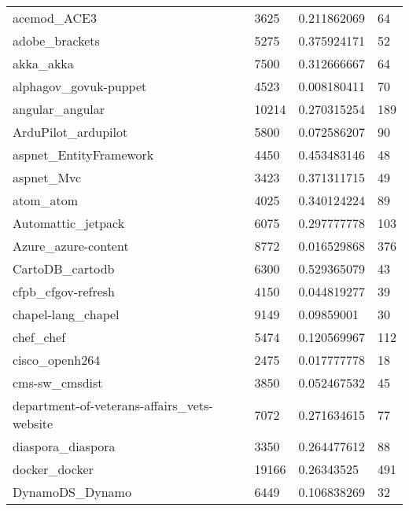 \begin{center}
\begin{longtable}{l|l|l|l}
\hline \hline
\endlastfoot

acemod\_ACE3                                 & 3625     & 0.211862069     & 64  \\
adobe\_brackets                              & 5275     & 0.375924171     & 52  \\
akka\_akka                                   & 7500     & 0.312666667     & 64  \\
alphagov\_govuk-puppet                       & 4523     & 0.008180411     & 70  \\
angular\_angular                             & 10214    & 0.270315254     & 189 \\
ArduPilot\_ardupilot                         & 5800     & 0.072586207     & 90  \\
aspnet\_EntityFramework                      & 4450     & 0.453483146     & 48  \\
aspnet\_Mvc                                  & 3423     & 0.371311715     & 49  \\
atom\_atom                                   & 4025     & 0.340124224     & 89  \\
Automattic\_jetpack                          & 6075     & 0.297777778     & 103 \\
Azure\_azure-content                         & 8772     & 0.016529868     & 376 \\
CartoDB\_cartodb                             & 6300     & 0.529365079     & 43  \\
cfpb\_cfgov-refresh                          & 4150     & 0.044819277     & 39  \\
chapel-lang\_chapel                          & 9149     & 0.09859001      & 30  \\
chef\_chef                                   & 5474     & 0.120569967     & 112 \\
cisco\_openh264                              & 2475     & 0.017777778     & 18  \\
cms-sw\_cmsdist                              & 3850     & 0.052467532     & 45  \\
department-of-veterans-affairs\_vets-website & 7072     & 0.271634615     & 77  \\
diaspora\_diaspora                           & 3350     & 0.264477612     & 88  \\
docker\_docker                               & 19166    & 0.26343525      & 491 \\
DynamoDS\_Dynamo                             & 6449     & 0.106838269     & 32  \\

\end{longtable}
\end{center}

